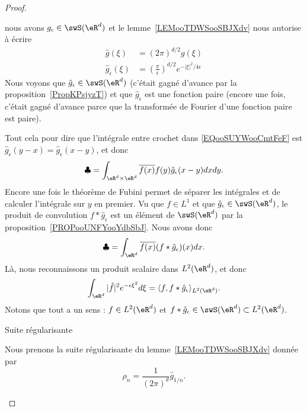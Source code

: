 \begin{proof}
\begin{subproof}
        nous avons \( g_{\epsilon}\in \swS(\eR^d)\) et le lemme~\ref{LEMooTDWSooSBJXdv} nous autorise à écrire
        \begin{subequations}
            \begin{align}
                \hat g(\xi)&=(2\pi)^{d/2}g(\xi)\\
                \hat g_{\epsilon}(\xi)&=\left( \frac{ \pi }{ \epsilon } \right)^{d/2} e^{-| \xi |^2/4\epsilon}
            \end{align}
        \end{subequations}
        Nous voyons que \( \hat g_{\epsilon}\in\swS(\eR^d)\) (c'était gagné d'avance par la proposition~\ref{PropKPsjyzT}) et que \( \hat g_{\epsilon}\) est une fonction paire (encore une fois, c'était gagné d'avance parce que la transformée de Fourier d'une fonction paire est paire).

        Tout cela pour dire que l'intégrale entre crochet dans \eqref{EQooSUYWooCmtFeF} est \( \hat g_{\epsilon}(y-x)=\hat g_{\epsilon}(x-y)\), et donc
        \begin{equation}
            \clubsuit=\int_{\eR^d\times \eR^d} \overline{ f(x) }f(y)  \hat g_{\epsilon}(x-y)  dxdy.
        \end{equation}
        Encore une fois le théorème de Fubini permet de séparer les intégrales et de calculer l'intégrale sur \( y\) en premier. Vu que \( f\in L^1\) et que \( \hat g_{\epsilon}\in \swS(\eR^d)\), le produit de convolution \( f*\hat g_{\epsilon}\) est un élément de \( \swS(\eR^d)\) par la proposition~\ref{PROPooUNFYooYdbSbJ}.
        Nous avons donc
        \begin{equation}
            \clubsuit=\int_{\eR^d}\overline{ f(x) }(f* \hat g_{\epsilon})(x)dx.
        \end{equation}
        Là, nous reconnaissons un produit scalaire dans \( L^2(\eR^d)\), et donc
        \begin{equation}        \label{EQooWIHNooHutHlS}
            \int_{\eR^d}| \hat f |^2 e^{-\epsilon\xi^2}d\xi=\langle f, f*\hat g_{\epsilon}\rangle_{L^2(\eR^d)}.
        \end{equation}
        Notons que tout a un sens : \( f\in L^2(\eR^d)\) et \( f*\hat g_{\epsilon}\in\swS(\eR^d)\subset L^2(\eR^d)\).

    \item[Suite régularisante]

        Nous prenons la suite régularisante du lemme~\ref{LEMooTDWSooSBJXdv} donnée par
        \begin{equation}
            \rho_n=\frac{1}{ (2\pi)^d }\hat g_{1/n}.
        \end{equation}


\end{subproof}
\end{proof}
